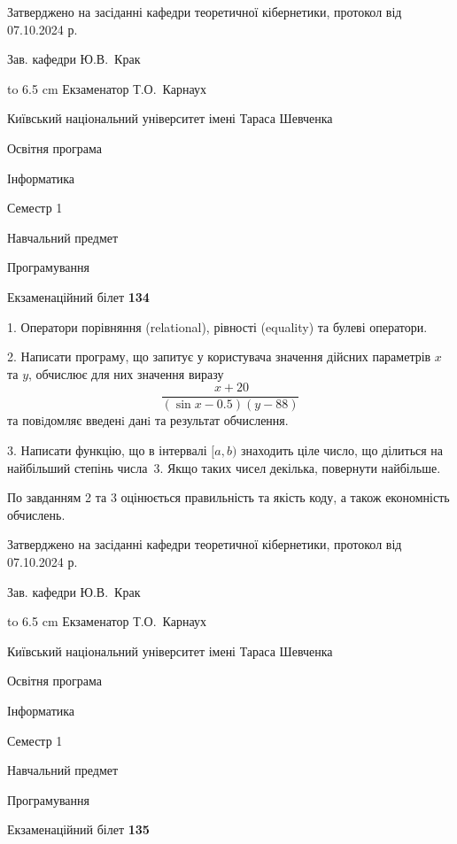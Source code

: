 \documentclass[12pt, ukrainian]{article}
\begin{document}
{\smallskip\smallskip \begin {scriptsize} Затверджено на засіданні кафедри теоретичної кібернетики, протокол   від   07.10.2024 р.\par\smallskip\smallskip\smallskip\smallskip
{\parbox {6.5 cm} {Зав. кафедри \dotfill Ю.В.~Крак}}\hspace {0.7cm} {\hbox to 6.5 cm { Екзаменатор \dotfill Т.О.~Карнаух}} \end{scriptsize}}
\vspace{0.9cm}
{{\begin {scriptsize}\par
{ \center  Київський національний університет імені Тараса Шевченка \par}
{\parbox {5 cm}{Освітня програма \hfill}{\parbox {7 cm}{Інформатика\hfill}}\parbox {6 cm}{\hfill Семестр 1}}\par
{\parbox {5 cm} {Навчальний предмет \hfill}\parbox {7 cm}{Програмування \hfill}\parbox {6cm}{\hfill}\par}\vspace{-15pt} \end{scriptsize}}{\center Екзаменаційний білет \No \textbf { 134 }\par}}
{%
1. Оператори порівняння (relational), рівності (equality) та булеві оператори.%
\par
2. Написати програму, що запитує у користувача значення дійсних параметрів $x$ та $y$, обчислює для них значення виразу 
$$\frac{\ x + 20}{(\sin x - 0.5) (y - 88)}$$ 
та повiдомляє введенi данi та результат обчислення.

\par
3. Написати функцію, що в інтервалі $[a, b)$ знаходить ціле число, що ділиться на найбільший степінь числа 3. Якщо таких чисел декілька, повернути найбільше.

По завданням 2 та 3 оцінюється правильність та якість коду, а також економність обчислень.

}
{\smallskip\smallskip \begin {scriptsize} Затверджено на засіданні кафедри теоретичної кібернетики, протокол   від   07.10.2024 р.\par\smallskip\smallskip\smallskip\smallskip
{\parbox {6.5 cm} {Зав. кафедри \dotfill Ю.В.~Крак}}\hspace {0.7cm} {\hbox to 6.5 cm { Екзаменатор \dotfill Т.О.~Карнаух}} \end{scriptsize}}
\vspace{0.9cm}
{{\begin {scriptsize}\par
{ \center  Київський національний університет імені Тараса Шевченка \par}
{\parbox {5 cm}{Освітня програма \hfill}{\parbox {7 cm}{Інформатика\hfill}}\parbox {6 cm}{\hfill Семестр 1}}\par
{\parbox {5 cm} {Навчальний предмет \hfill}\parbox {7 cm}{Програмування \hfill}\parbox {6cm}{\hfill}\par}\vspace{-15pt} \end{scriptsize}}{\center Екзаменаційний білет \No \textbf { 135 }\par}}
\end{document}
